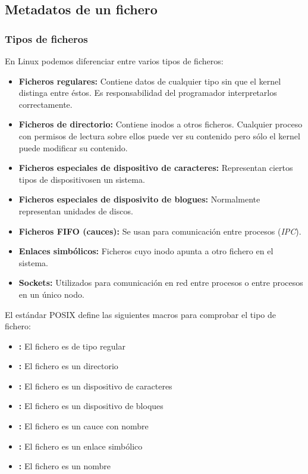 \subsection{Metadatos de un fichero}

\subsubsection{Tipos de ficheros}

En Linux podemos diferenciar entre varios tipos de ficheros:

\begin{itemize}
	\item\textbf{Ficheros regulares:} Contiene datos de cualquier tipo sin que el kernel distinga entre éstos. Es responsabilidad del programador interpretarlos correctamente.
	\item\textbf{Ficheros de directorio:} Contiene inodos a otros ficheros. Cualquier proceso con permisos de lectura sobre ellos puede ver su contenido pero sólo el kernel puede modificar su contenido.
	\item\textbf{Ficheros especiales de dispositivo de caracteres:} Representan ciertos tipos de dispositivosen un sistema.
	\item\textbf{Ficheros especiales de disposivito de blogues:} Normalmente representan unidades de discos.
	\item\textbf{Ficheros FIFO (cauces):} Se usan para comunicación entre procesos (\emph{IPC}).
	\item\textbf{Enlaces simbólicos:} Ficheros cuyo inodo apunta a otro fichero en el sistema.
	\item\textbf{Sockets:} Utilizados para comunicación en red entre procesos o entre procesos en un único nodo.
\end{itemize}

El estándar POSIX define las siguientes macros para comprobar el tipo de fichero:

\begin{itemize}
	\item{}\textbf{:} El fichero es de tipo regular
	\item{}\textbf{:} El fichero es un directorio
	\item{}\textbf{:} El fichero es un dispositivo de caracteres
	\item{}\textbf{:} El fichero es un dispositivo de bloques
	\item{}\textbf{:} El fichero es un cauce con nombre
	\item{}\textbf{:} El fichero es un enlace simbólico
	\item{}\textbf{:} El fichero es un nombre
\end{itemize}

